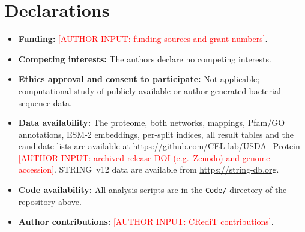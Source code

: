 \documentclass[pdflatex,sn-mathphys-num]{sn-jnl}
\newcommand{\authorinput}[1]{\textcolor{red}{[AUTHOR INPUT: #1]}}
\begin{document}
\section*{Declarations}
\begin{itemize}
\item \textbf{Funding:} \authorinput{funding sources and grant numbers}.
\item \textbf{Competing interests:} The authors declare no competing interests.
\item \textbf{Ethics approval and consent to participate:} Not applicable; computational study of publicly available or author-generated bacterial sequence data.
\item \textbf{Data availability:} The proteome, both networks, mappings, Pfam/GO annotations, ESM-2 embeddings, per-split indices, all result tables and the candidate lists are available at \url{https://github.com/CEL-lab/USDA_Protein} \authorinput{archived release DOI (e.g.\ Zenodo) and genome accession}. STRING~v12 data are available from \url{https://string-db.org}.
\item \textbf{Code availability:} All analysis scripts are in the \texttt{Code/} directory of the repository above.
\item \textbf{Author contributions:} \authorinput{CRediT contributions}.
\end{itemize}
\end{document}
